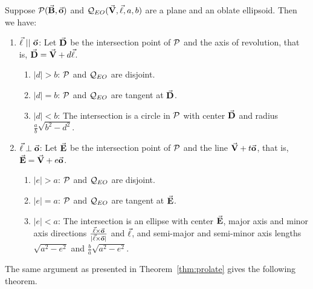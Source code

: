 \begin{lemma}
     Suppose ${\cal P}(\vec{\bf B},\vec{\bf o})$ and
${\cal Q}_{EO}(\vec{\bf V},\vec{\bf \ell},a,b)$ are a plane and an oblate
ellipsoid.  Then we have:
\begin{enumerate}
     \item $\vec{\bf \ell}\ ||\ \vec{\bf o}$: Let $\vec{\bf D}$ be the intersection
          point of ${\cal P}$ and the axis of revolution, that is,
          $\vec{\bf D}=\vec{\bf V}+d\vec{\bf \ell}$.
     \begin{enumerate}
          \item $|d|>b$: ${\cal P}$ and ${\cal Q}_{EO}$ are disjoint.
          \item $|d|=b$: ${\cal P}$ and ${\cal Q}_{EO}$ are tangent at 
               $\vec{\bf D}$.
          \item $|d|<b$: The intersection is a circle in ${\cal P}$ with
               center $\vec{\bf D}$ and radius $\frac{a}{b}\sqrt{b^2-d^2}$.
     \end{enumerate}
     \item $\vec{\bf \ell}\perp\vec{\bf o}$: Let $\vec{\bf E}$ be the intersection
          point of ${\cal P}$ and the line $\vec{\bf V}+t\vec{\bf o}$, that is,
          $\vec{\bf E}=\vec{\bf V}+e\vec{\bf o}$.
     \begin{enumerate}
          \item $|e|>a$: ${\cal P}$ and ${\cal Q}_{EO}$ are disjoint.
          \item $|e|=a$: ${\cal P}$ and ${\cal Q}_{EO}$ are tangent at 
               $\vec{\bf E}$.
          \item $|e|<a$: The intersection is an ellipse with center 
               $\vec{\bf E}$, major axis and minor axis directions
          $\frac{\vec{\bf \ell}\times\vec{\bf o}}{|\vec{\bf \ell}\times\vec{\bf o}|}$
               and $\vec{\bf \ell}$,
               and semi-major and semi-minor axis lengths $\sqrt{a^2-e^2}$
               and $\frac{b}{a}\sqrt{a^2-e^2}$.
     \end{enumerate}
\end{enumerate}
\end{lemma}

     The same argument as presented in Theorem~\ref{thm:prolate}
gives the following theorem.

